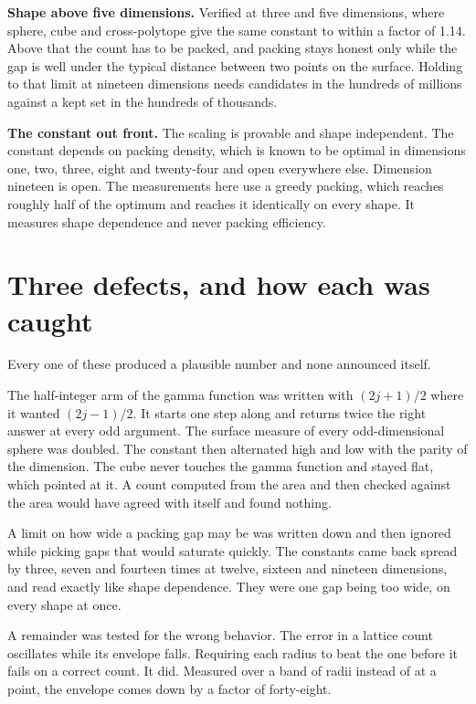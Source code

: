 \textbf{Shape above five dimensions.} Verified at three and five dimensions, where sphere, cube and cross-polytope give the same constant to within a factor of 1.14. Above that the count has to be packed, and packing stays honest only while the gap is well under the typical distance between two points on the surface. Holding to that limit at nineteen dimensions needs candidates in the hundreds of millions against a kept set in the hundreds of thousands.

\textbf{The constant out front.} The scaling is provable and shape independent. The constant depends on packing density, which is known to be optimal in dimensions one, two, three, eight and twenty-four and open everywhere else. Dimension nineteen is open. The measurements here use a greedy packing, which reaches roughly half of the optimum and reaches it identically on every shape. It measures shape dependence and never packing efficiency.

\section{Three defects, and how each was caught}

Every one of these produced a plausible number and none announced itself.

The half-integer arm of the gamma function was written with $(2j+1)/2$ where it wanted $(2j-1)/2$. It starts one step along and returns twice the right answer at every odd argument. The surface measure of every odd-dimensional sphere was doubled. The constant then alternated high and low with the parity of the dimension. The cube never touches the gamma function and stayed flat, which pointed at it. A count computed from the area and then checked against the area would have agreed with itself and found nothing.

A limit on how wide a packing gap may be was written down and then ignored while picking gaps that would saturate quickly. The constants came back spread by three, seven and fourteen times at twelve, sixteen and nineteen dimensions, and read exactly like shape dependence. They were one gap being too wide, on every shape at once.

A remainder was tested for the wrong behavior. The error in a lattice count oscillates while its envelope falls. Requiring each radius to beat the one before it fails on a correct count. It did. Measured over a band of radii instead of at a point, the envelope comes down by a factor of forty-eight.

